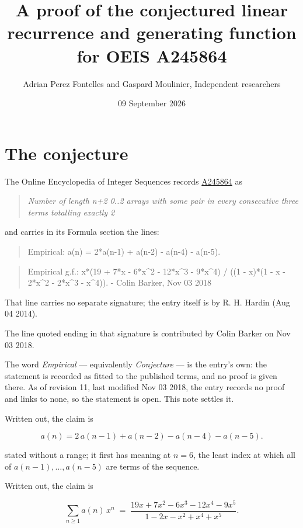 \documentclass[11pt]{article}
\title{A proof of the conjectured linear recurrence and generating function for OEIS A245864}
\author{Adrian Perez Fontelles and Gaspard Moulinier, Independent researchers}
\date{09 September 2026}
\theoremstyle{definition}
\begin{document}
\maketitle
\section{The conjecture}

The Online Encyclopedia of Integer Sequences records \href{https://oeis.org/A245864}{A245864} as

\begin{quote}\itshape Number of length n+2 0..2 arrays with some pair in every consecutive three terms totalling exactly 2\end{quote}

and carries in its Formula section the lines:

\begin{quote}\ttfamily Empirical: a(n) = 2*a(n-1) + a(n-2) - a(n-4) - a(n-5).\end{quote}

\begin{quote}\ttfamily Empirical g.f.: x*(19 + 7*x - 6*x\textasciicircum{}2 - 12*x\textasciicircum{}3 - 9*x\textasciicircum{}4) / ((1 - x)*(1 - x - 2*x\textasciicircum{}2 - 2*x\textasciicircum{}3 - x\textasciicircum{}4)). - Colin Barker, Nov 03 2018\end{quote}

That line carries no separate signature; the entry itself is by R. H. Hardin (Aug 04 2014).

The line quoted ending in that signature is contributed by Colin Barker on Nov 03 2018.

The word {\itshape Empirical} --- equivalently {\itshape Conjecture} --- is the entry's own: the statement is recorded as fitted to the published terms, and no proof is given there. As of revision 11, last modified Nov 03 2018, the entry records no proof and links to none, so the statement is open. This note settles it.

Written out, the claim is

\[a(n) = 2\,a(n-1) + a(n-2) - a(n-4) - a(n-5).\]

stated without a range; it first has meaning at $n = 6$, the least index at which all of $a(n-1),\dots,a(n-5)$ are terms of the sequence.

Written out, the claim is

\[\sum_{n \ge 1} a(n)\,x^n \;=\; \frac{19x + 7x^{2} - 6x^{3} - 12x^{4} - 9x^{5}}{1 - 2x - x^{2} + x^{4} + x^{5}}.\]
\end{document}
